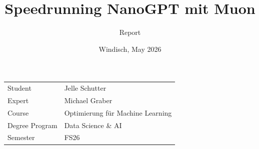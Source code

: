 \documentclass[final]{fhnwreport}         %
\title{Speedrunning NanoGPT mit Muon}  %
\author{Report}    %
\date{Windisch, May 2026}               %
\begin{document}

\maketitle



\vspace*{10ex}

\begin{center}
\begin{tabular}{@{}p{5cm} l}
Student                    &    Jelle Schutter\\[2ex]
Expert                     &    Michael Graber\\[2ex]
Course                     &    Optimierung für Machine Learning\\[2ex]
Degree Program             &    Data Science \& AI \\[2ex]
Semester                   &    FS26\\[2ex]
\end{tabular}
\end{center}



\vspace*{4ex}

\clearpage
			
\thispagestyle{empty}


\tableofcontents
\clearpage
\end{document}
